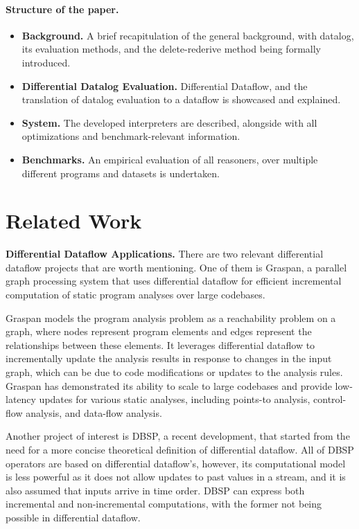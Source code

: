 \documentclass[sigconf,screen,review,natbib]{acmart}
\theoremstyle{definition}
\begin{document}
\paragraph{Structure of the paper.}
\begin{itemize}
	\item{\textbf{Background.}} A brief recapitulation of the general background, with datalog, its evaluation
	methods, and the delete-rederive method being formally introduced.
	\item{\textbf{Differential Datalog Evaluation.}} Differential Dataflow, and the translation of datalog evaluation to
	a dataflow is showcased and explained.
	\item{\textbf{System.}} The developed interpreters are described, alongside with all optimizations and
	benchmark-relevant information.
	\item{\textbf{Benchmarks.}} An empirical evaluation of all reasoners, over multiple different programs and
	datasets is undertaken.
\end{itemize}
\section{Related Work}

\textbf{Differential Dataflow Applications.} There are two relevant differential dataflow projects that are worth
mentioning. One of them is Graspan, a parallel graph processing system that uses differential dataflow for efficient
incremental computation of static program analyses over large codebases.

Graspan models the program analysis problem as a reachability problem on a graph, where nodes represent program elements
and edges represent the relationships between these elements. It leverages differential dataflow to incrementally update
the analysis results in response to changes in the input graph, which can be due to code modifications or updates to
the analysis rules. Graspan has demonstrated its ability to scale to large codebases and provide low-latency updates
for various static analyses, including points-to analysis, control-flow analysis, and data-flow analysis.

Another project of interest is DBSP\cite{dbsp}, a recent development, that started from the need for a more concise
theoretical definition of differential dataflow. All of DBSP operators are based on differential dataflow's, however, its
computational model is less powerful as it does not allow updates to past values in a stream, and it is also assumed that
inputs arrive in time order. DBSP can express both incremental and non-incremental computations, with the former not being
possible in differential dataflow.
\end{document}
